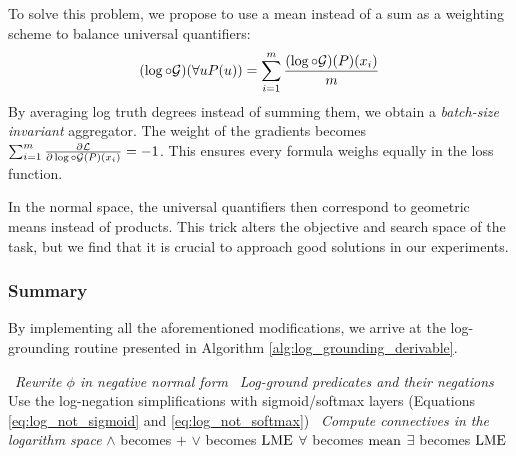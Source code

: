 \documentclass{article}
\theoremstyle{definition}
\begin{document}
To solve this problem, we propose to use a mean instead of a sum as a weighting scheme to balance universal quantifiers:
\begin{equation}
\label{eq:forall_invariant}
    (\log\circ\mathcal{G})(\forall u P(u)) = \sum_{i=1}^m \frac{(\log\circ\mathcal{G})(P)(x_i)}{m}
\end{equation}
By averaging log truth degrees instead of summing them, we obtain a \emph{batch-size invariant} aggregator.
The weight of the gradients becomes $\sum_{i=1}^m \frac{\partial \mathcal{L}}{\partial \log\circ\mathcal{G}(P)(x_i)} = -1$.
This ensures every formula weighs equally in the loss function.%

In the normal space, the universal quantifiers then correspond to geometric means instead of products.
This trick alters the objective and search space of the task, but we find that it is crucial to approach good solutions in our experiments.

\subsubsection{Summary}
By implementing all the aforementioned modifications, 
we arrive at the log-grounding routine presented in Algorithm \ref{alg:log_grounding_derivable}.

\begin{algorithm}
\caption{Compute $(\log\circ\Gt)(\phi)$ for derivability}
\label{alg:log_grounding_derivable}
\begin{algorithmic}[1]
     \ {\it Rewrite $\phi$ in negative normal form}
     \ {\it Log-ground predicates and their negations}
        \State \indent Use the log-negation simplifications with sigmoid/softmax layers (Equations \ref{eq:log_not_sigmoid} and \ref{eq:log_not_softmax})
     \ {\it Compute connectives in the logarithm space}
        \State \indent $\land$ becomes $+$
        \State \indent $\lor$ becomes $\operatorname{LME}$
        \State \indent $\forall$ becomes $\operatorname{mean}$
        \State \indent $\exists$ becomes $\operatorname{LME}$        
\end{algorithmic}
\end{algorithm}
        
\end{document}
